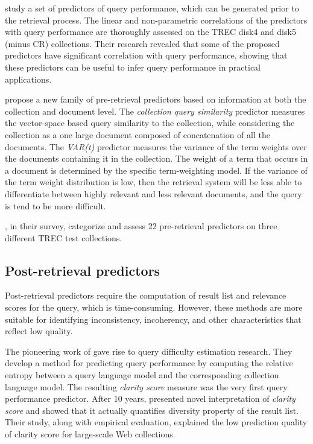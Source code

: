 \citet*{InferringQP} study a set of predictors of query performance, which can be generated prior to the retrieval process.
The linear and non-parametric correlations of the predictors with query performance are thoroughly assessed on the TREC disk4 and disk5 (minus CR) collections.
Their research revealed that  some of the proposed predictors have significant correlation with query performance, showing that these predictors can be useful to infer query performance in practical applications.

\citet*{preVar} propose a new family of pre-retrieval predictors based on information at both the collection and document level.
The \emph{collection query similarity} predictor measures the vector-space based query similarity to the collection, while considering the collection as a one large document composed of concatenation of all the documents. The \emph{VAR(t)} predictor measures the variance of the term weights over the documents containing it in the collection. 
The weight of a term that occurs in a document is determined by the specific term-weighting model. 
If the variance of the term weight distribution is low, then the retrieval system will be less able to differentiate between highly relevant and less relevant documents, and the query is tend to be more difficult. 

\citet*{preSurvey}, in their survey, categorize and assess 22 pre-retrieval predictors on three different TREC test collections.

\subsection{Post-retrieval predictors}
Post-retrieval predictors require the computation of result list and relevance scores for the query, which is time-consuming. 
However, these methods are more suitable for identifying inconsistency, incoherency, and other characteristics that reflect low quality. 

The pioneering work of \citet*{clarity} gave rise to query difficulty estimation research. They develop a method for predicting query performance by computing the relative entropy between a query language model and the corresponding collection language model. The resulting \emph{clarity score} measure was the very first query performance predictor. After 10 years, \citet*{clarityRe} presented novel interpretation of \emph{clarity score} and showed that it actually quantifies diversity property of the result list. Their study, along with empirical evaluation, explained the low prediction quality of clarity score for large-scale Web collections.

